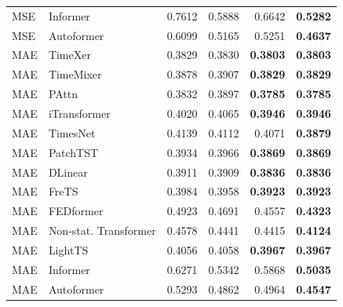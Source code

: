 \begin{longtable}{llrrrr}
MSE & Informer & 0.7612 & 0.5888 & 0.6642 & \textbf{0.5282} \\
MSE & Autoformer & 0.6099 & 0.5165 & 0.5251 & \textbf{0.4637} \\
\midrule
MAE & TimeXer & 0.3829 & 0.3830 & \textbf{0.3803} & \textbf{0.3803} \\
MAE & TimeMixer & 0.3878 & 0.3907 & \textbf{0.3829} & \textbf{0.3829} \\
MAE & PAttn & 0.3832 & 0.3897 & \textbf{0.3785} & \textbf{0.3785} \\
MAE & iTransformer & 0.4020 & 0.4065 & \textbf{0.3946} & \textbf{0.3946} \\
MAE & TimesNet & 0.4139 & 0.4112 & 0.4071 & \textbf{0.3879} \\
MAE & PatchTST & 0.3934 & 0.3966 & \textbf{0.3869} & \textbf{0.3869} \\
MAE & DLinear & 0.3911 & 0.3909 & \textbf{0.3836} & \textbf{0.3836} \\
MAE & FreTS & 0.3984 & 0.3958 & \textbf{0.3923} & \textbf{0.3923} \\
MAE & FEDformer & 0.4923 & 0.4691 & 0.4557 & \textbf{0.4323} \\
MAE & Non-stat. Transformer & 0.4578 & 0.4441 & 0.4415 & \textbf{0.4124} \\
MAE & LightTS & 0.4056 & 0.4058 & \textbf{0.3967} & \textbf{0.3967} \\
MAE & Informer & 0.6271 & 0.5342 & 0.5868 & \textbf{0.5035} \\
MAE & Autoformer & 0.5293 & 0.4862 & 0.4964 & \textbf{0.4547} \\
\end{longtable}
\endgroup

